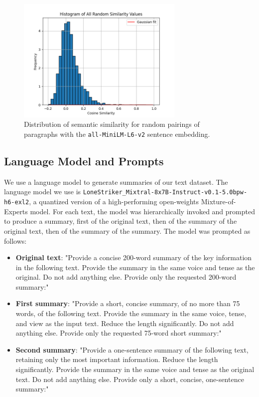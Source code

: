 \documentclass{article}
\begin{document}
{\begin{figure}
	\centering
	\includegraphics[height=6cm]{Histogram_of_All_Random_Similarity_Values.png}
	\caption{Distribution of semantic similarity for random pairings of paragraphs with the \texttt{all-MiniLM-L6-v2} sentence embedding.}
	\label{fig:randomsimilarity}
\end{figure}

\subsection{Language Model and Prompts}

We use a language model to generate summaries of our text dataset.
The language model we use is \texttt{LoneStriker\_Mixtral-8x7B-Instruct-v0.1-5.0bpw-h6-exl2}, a quantized version of a high-performing open-weights Mixture-of-Experts model.
For each text, the model was hierarchically invoked and prompted to produce a summary, first of the original text, then of the summary of the original text, then of the summary of the summary.  
The model was prompted as follows:

\begin{itemize}
	\item \textbf{Original text}: "Provide a concise 200-word summary of the key information in the following text.  Provide the summary in the same voice and tense as the original.  Do not add anything else.  Provide only the requested 200-word summary:"
	\item \textbf{First summary}: "Provide a short, concise summary, of no more than 75 words, of the following text.  Provide the summary in the same voice, tense, and view as the input text.  Reduce the length significantly.  Do not add anything else.  Provide only the requested 75-word short summary:"
	\item \textbf{Second summary}: "Provide a one-sentence summary of the following text, retaining only the most important information.  Reduce the length significantly.  Provide the summary in the same voice and tense as the original text.  Do not add anything else.  Provide only a short, concise, one-sentence summary:"
\end{itemize}

}
\end{document}
